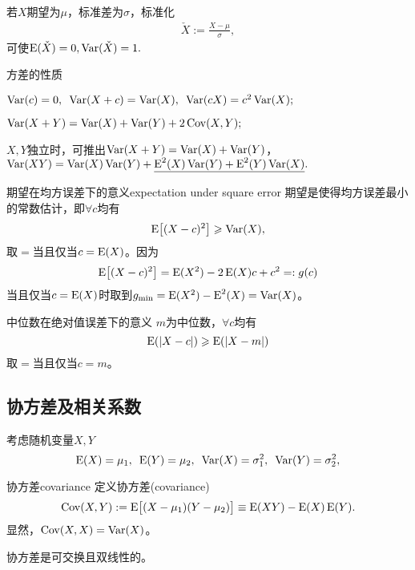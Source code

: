若$X$期望为$\mu$，标准差为$\sigma$，标准化
\begin{align}
	\check X:=\frac{X-\mu}{\sigma},
\end{align}
可使$\E(\check X)=0,\Var(\check X)=1.$
\begin{theorem}{方差的性质}{}
	\begin{compactenum}
		\item $\Var(c)=0,\enspace\Var(X+c)=\Var(X),\enspace\Var(cX)=c^2\Var(X);$
		\item $\Var(X+Y)=\Var(X)+\Var(Y)+2\Cov(X,Y);$
		\item $X,Y$独立时，可推出$\Var(X+Y)=\Var(X)+\Var(Y)$，\\
		$\Var(XY)=\Var(X)\Var(Y)+\underline{\E^2(X)\Var(Y)+\E^2(Y)\Var(X)}.$
	\end{compactenum}	
\end{theorem}
\begin{example}{期望在均方误差下的意义}{expectation under square error}
	期望是使得均方误差最小的常数估计，即$\forall c$均有
	\[
		\E\bigfkh{(X-c)^2}\geqslant\Var(X),
	\]
	取$=$当且仅当$c=\E(X)$。因为
	\begin{align*}
		\E\bigfkh{(X-c)^2}=\E(X^2)-2\E(X)c+c^2=:g(c)
	\end{align*}
	当且仅当$c=\E(X)$时取到$g_{\mathrm{min}}=\E(X^2)-\E^2(X)=\Var(X)$。
\end{example}
\begin{example}{中位数在绝对值误差下的意义}{}
	$m$为中位数，$\forall c$均有
	\[
		\E(|X-c|)\geqslant\E(|X-m|)
	\]
	取$=$当且仅当$c=m$。
\end{example}
\subsection{协方差及相关系数}
考虑随机变量$X,Y$
\[
	\E(X)=\mu_1,\enspace\E(Y)=\mu_2,\enspace\Var(X)=\sigma_1^2,\enspace\Var(Y)=\sigma_2^2,
\]
\begin{definition}{协方差}{covariance}
	定义协方差(covariance)
	\begin{align}
		\Cov(X,Y):=\E\bigfkh{(X-\mu_1)(Y-\mu_2)}\equiv\E(XY)-\E(X)\E(Y).
	\end{align}
	显然，$\Cov(X,X)=\Var(X)$。
\end{definition}
协方差是可交换且双线性的。

